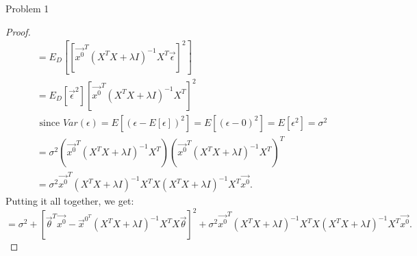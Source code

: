 \documentclass[a4paper]{article}
\begin{document}
\begin{note}{Problem 1}
\begin{enumerate}
\begin{proof}
\begin{align*}
                                                            &= E_D[[\vec{x^0}^T(X^T X + \lambda I)^{-1} X^T \vec{\epsilon}]^2] \\
                                                            &= E_D[\vec{\epsilon}^2] [\vec{x^0}^T(X^T X + \lambda I)^{-1} X^T ]^2 \\  
                                                            & \text{ since $Var(\epsilon) = E[(\epsilon - E[\epsilon])^2] = E[(\epsilon - 0)^2] = E[\epsilon^2] = \sigma^2$} \\
                                                            &= \sigma^2 (\vec{x^0}^T(X^T X + \lambda I)^{-1} X^T) (\vec{x^0}^T(X^T X + \lambda I)^{-1} X^T)^T\\  
                                                            &= \sigma^2 \vec{x^0}^T(X^T X + \lambda I)^{-1} X^T X (X^T X + \lambda I)^{-1} X^T \vec{x^0}
      .\end{align*}
      Putting it all together, we get:
      \[
      = \sigma^2 + [\vec{\theta}^T \vec{x^0} - \vec{x}^{0^T}(X^T X + \lambda I)^{-1}X^T X \vec{\theta}]^2 + \sigma^2 \vec{x^0}^T(X^T X + \lambda I)^{-1} X^T X (X^T X + \lambda I)^{-1} X^T \vec{x^0}

      .\] 
    \end{proof}
\end{enumerate}
   
\end{note}
\end{document}
